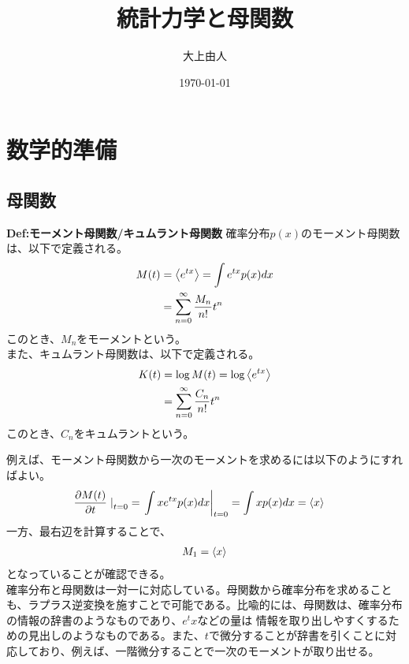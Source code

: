 \documentclass[a4paper,11pt]{jsarticle}
\numberwithin{equation}{section}
\begin{document}
\title{統計力学と母関数}
\author{大上由人}
\date{\today}
\maketitle
\section{数学的準備}
\subsection{母関数}
\begin{itembox}[l]{\textbf{Def:モーメント母関数/キュムラント母関数}}
    確率分布$p(x)$のモーメント母関数は、以下で定義される。
    \begin{align}
      M(t) &= \expval{e^{tx}} = \int e^{tx} p(x) dx \label{eq:moment}\\
      &= \sum_{n=0}^{\infty} \frac{M_n}{n!} t^n
    \end{align}
    このとき、$M_n$をモーメントという。\\
    また、キュムラント母関数は、以下で定義される。
    \begin{align}
      K(t) &= \log M(t) = \log \expval{e^{tx}} \label{eq:cumulant}\\
      &= \sum_{n=0}^{\infty} \frac{C_n}{n!} t^n
    \end{align}
    このとき、$C_n$をキュムラントという。
  \end{itembox}
例えば、モーメント母関数から一次のモーメントを求めるには以下のようにすればよい。
\begin{align}
  \pdv{M(t)}{t}\left.\right|_{t=0} &= \left.\int x e^{tx} p(x) dx\right|_{t=0} = \int x p(x) dx = \expval{x}
\end{align}
一方、最右辺を計算することで、
\begin{align}
  M_1 = \expval{x}
\end{align}
となっていることが確認できる。\\
確率分布と母関数は一対一に対応している。母関数から確率分布を求めることも、ラプラス逆変換を施すことで可能である。比喩的には、母関数は、確率分布の情報の辞書のようなものであり、$e^tx$などの量は
情報を取り出しやすくするための見出しのようなものである。また、$t$で微分することが辞書を引くことに対応しており、例えば、一階微分することで一次のモーメントが取り出せる。\\
\end{document}
